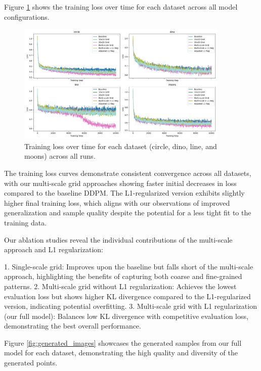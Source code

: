 \documentclass{article} %
\begin{document}
Figure \ref{fig:train_loss} shows the training loss over time for each dataset across all model configurations.

\begin{figure}[ht]
    \centering
    \includegraphics[width=0.9\textwidth]{train_loss.png}
    \caption{Training loss over time for each dataset (circle, dino, line, and moons) across all runs.}
    \label{fig:train_loss}
\end{figure}

The training loss curves demonstrate consistent convergence across all datasets, with our multi-scale grid approaches showing faster initial decreases in loss compared to the baseline DDPM. The L1-regularized version exhibits slightly higher final training loss, which aligns with our observations of improved generalization and sample quality despite the potential for a less tight fit to the training data.

Our ablation studies reveal the individual contributions of the multi-scale approach and L1 regularization:

1. Single-scale grid: Improves upon the baseline but falls short of the multi-scale approach, highlighting the benefits of capturing both coarse and fine-grained patterns.
2. Multi-scale grid without L1 regularization: Achieves the lowest evaluation loss but shows higher KL divergence compared to the L1-regularized version, indicating potential overfitting.
3. Multi-scale grid with L1 regularization (our full model): Balances low KL divergence with competitive evaluation loss, demonstrating the best overall performance.

Figure \ref{fig:generated_images} showcases the generated samples from our full model for each dataset, demonstrating the high quality and diversity of the generated points.
\end{document}
